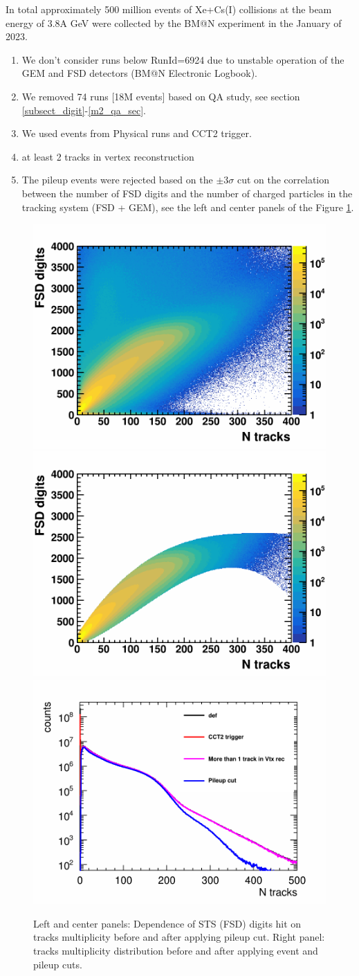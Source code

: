     In total approximately 500 million events of Xe+Cs(I) collisions at the beam energy of 3.8A GeV were collected by the BM@N experiment in the January of 2023.
    \begin{enumerate}
        \item We don’t consider runs below RunId=6924 due to unstable operation of the GEM and FSD detectors (BM@N Electronic Logbook).
        \item We removed 74 runs [18M events] based on QA study, see section \ref{subsect_digit}-\ref{m2_qa_sec}.
        \item We used events from Physical runs and CCT2 trigger.
        \item at least 2 tracks in vertex reconstruction
        \item The pileup events were rejected based on the $\pm3\sigma$ cut on the correlation between the number of FSD digits and the number of charged particles in the tracking system (FSD + GEM), see the left and center panels of the Figure  \ref{fig:pileup}.
    \end{enumerate}

    \begin{figure}[H]
        \begin{center}
            \includegraphics[width=0.32\linewidth]{../pict/QA_RunByRun_24.12/H2_NoRuns/cut4_h2_nTracks_stsDigits.png}
            \includegraphics[width=0.32\linewidth]{../pict/QA_RunByRun_24.12/H2_NoRuns/cut5_h2_nTracks_stsDigits.png}
            \includegraphics[width=0.32\linewidth]{../pict/QA_RunByRun_24.12/AA_24.04_h2_1d_nTracks.png}
            \vspace{-3mm}
            \caption{Left and center panels: Dependence of STS (FSD) digits hit on tracks multiplicity before and after applying pileup cut. Right panel: tracks multiplicity distribution before and after applying event and pileup cuts.}
        \end{center}
        \label{fig:pileup}
        \vspace{-5mm}
    \end{figure}

